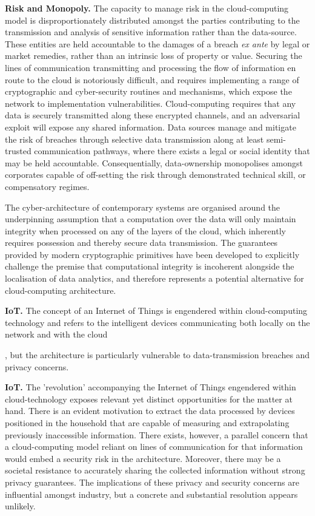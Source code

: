 \documentclass[twocolumn]{scrartcl}
\begin{document}
\textbf{Risk and Monopoly.} The capacity to manage risk in the cloud-computing model is disproportionately distributed amongst the parties contributing to the transmission and analysis of sensitive information rather than the data-source. These entities are held accountable to the damages of a breach \textit{ex ante} by legal or market remedies, rather than an intrinsic loss of property or value. Securing the lines of communication transmitting and processing the flow of information en route to the cloud is notoriously difficult, and requires implementing a range of cryptographic and cyber-security routines and mechanisms, which expose the network to implementation vulnerabilities. Cloud-computing requires that any data is securely transmitted along these encrypted channels, and an adversarial exploit will expose any shared information. Data sources manage and mitigate the risk of breaches through selective data transmission along at least semi-trusted communication pathways, where there exists a legal or social identity that may be held accountable. Consequentially, data-ownership monopolises amongst corporates capable of off-setting the risk through demonstrated technical skill, or compensatory regimes. 

The cyber-architecture of contemporary systems are organised around the underpinning assumption that a computation over the data will only maintain integrity when processed on any of the layers of the cloud, which inherently requires possession and thereby secure data transmission. The guarantees provided by modern cryptographic primitives have been developed to explicitly challenge the premise that computational integrity is incoherent alongside the localisation of data analytics, and therefore represents a potential alternative for cloud-computing architecture.

\textbf{IoT.} The concept of an Internet of Things is engendered within cloud-computing technology and refers to the intelligent devices communicating both locally on the network and with the cloud 

, but the architecture is particularly vulnerable to data-transmission breaches and privacy concerns. 

\textbf{IoT.} The 'revolution' accompanying the Internet of Things engendered within cloud-technology exposes relevant yet distinct opportunities for the matter at hand. There is an evident motivation to extract the data processed by devices positioned in the household that are capable of measuring and extrapolating previously inaccessible information. There exists, however, a parallel concern that a cloud-computing model reliant on lines of communication for that information would embed a security risk in the architecture. Moreover, there may be a societal resistance to accurately sharing the collected information without strong privacy guarantees. The implications of these privacy and security concerns are influential amongst industry, but a concrete and substantial resolution appears unlikely.
\end{document}
